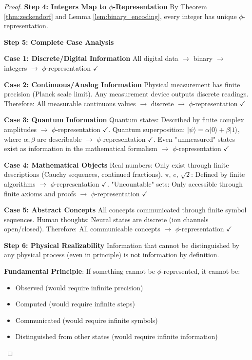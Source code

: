 \documentclass[12pt,letterpaper]{article}
\begin{document}
\begin{proof}
\textbf{Step 4: Integers Map to $\phi$-Representation}
By Theorem \ref{thm:zeckendorf} and Lemma \ref{lem:binary_encoding}, every integer has unique $\phi$-representation.

\textbf{Step 5: Complete Case Analysis}

\textbf{Case 1: Discrete/Digital Information}
All digital data $\to$ binary $\to$ integers $\to$ $\phi$-representation $\checkmark$

\textbf{Case 2: Continuous/Analog Information}
Physical measurement has finite precision (Planck scale limit). Any measurement device outputs discrete readings. Therefore: All measurable continuous values $\to$ discrete $\to$ $\phi$-representation $\checkmark$

\textbf{Case 3: Quantum Information}
Quantum states: Described by finite complex amplitudes $\to$ $\phi$-representation $\checkmark$. Quantum superposition: $|\psi\rangle = \alpha|0\rangle + \beta|1\rangle$, where $\alpha,\beta$ are describable $\to$ $\phi$-representation $\checkmark$. Even "unmeasured" states exist as information in the mathematical formalism $\to$ $\phi$-representation $\checkmark$

\textbf{Case 4: Mathematical Objects}
Real numbers: Only exist through finite descriptions (Cauchy sequences, continued fractions). $\pi$, $e$, $\sqrt{2}$: Defined by finite algorithms $\to$ $\phi$-representation $\checkmark$. "Uncountable" sets: Only accessible through finite axioms and proofs $\to$ $\phi$-representation $\checkmark$

\textbf{Case 5: Abstract Concepts}
All concepts communicated through finite symbol sequences. Human thoughts: Neural states are discrete (ion channels open/closed). Therefore: All communicable concepts $\to$ $\phi$-representation $\checkmark$

\textbf{Step 6: Physical Realizability}
Information that cannot be distinguished by any physical process (even in principle) is not information by definition.

\textbf{Fundamental Principle}: If something cannot be $\phi$-represented, it cannot be:
\begin{itemize}
\item Observed (would require infinite precision)
\item Computed (would require infinite steps)  
\item Communicated (would require infinite symbols)
\item Distinguished from other states (would require infinite information)
\end{itemize}


\end{proof}
\end{document}
